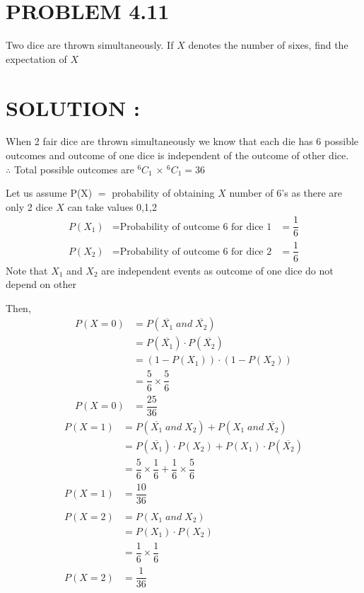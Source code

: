 \documentclass[journal,12pt,twocolumn]{IEEEtran}
\begin{document}
\section*{PROBLEM 4.11}
Two dice are thrown simultaneously. If $X$ denotes the number of sixes, find the
expectation of $X$
\section*{SOLUTION :}
 When 2 fair dice are thrown simultaneously we know that each die has 6 possible 
 outcomes and outcome of one dice is independent of the outcome of other dice.
 \\$\therefore$ Total possible outcomes are $^{6}C_{1}\,\times\,^{6}C_{1}=36$
 \null \par \null
 Let us assume P(X) $=$ probability of obtaining $X$ number of 6's as there are only
 2 dice $X$ can take values 0,1,2 
 \begin{align*}
 P(X_1) &= \text{Probability of outcome 6 for dice 1} &= \dfrac{1}{6} \\
P(X_2) &= \text{Probability of outcome 6 for dice 2} &= \dfrac{1}{6}   
 \end{align*}
Note that $X_1$ and $X_2$ are independent events as outcome of one dice do not depend 
on other
 \null \par \null
Then,
\begin{align*}
P(X=0) &= P(\overline{X_1}\;and\;\overline{X_2}) \\
       &= P(\overline{X_1})\cdot P(\overline{X_2}) \\
       &= (1-P(X_1))\cdot (1-P(X_2)) \\
       &= \dfrac{5}{6} \times \dfrac{5}{6} \\
P(X=0) &= \dfrac{25}{36}
\end{align*}
\newpage
\begin{align*}
P(X=1) &= P(\overline{X_1}\;and\;X_2) + P(X_1\;and\;\overline{X_2}) \\
       &= P(\overline{X_1})\cdot P(X_2) + P(X_1)\cdot P(\overline{X_2})  \\
       &= \dfrac{5}{6} \times \dfrac{1}{6} + \dfrac{1}{6} \times \dfrac{5}{6} \\
P(X=1) &= \dfrac{10}{36} \\ \\
P(X=2) &= P(X_1\;and\;X_2)  \\
       &= P(X_1)\cdot P(X_2)  \\
       &= \dfrac{1}{6} \times \dfrac{1}{6} \\
P(X=2) &= \dfrac{1}{36}
\end{align*}
\end{document}
